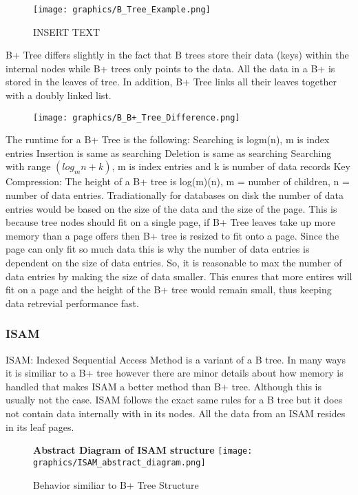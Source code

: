 \documentclass[letterpaper, 12pt]{article}
\begin{document}
\begin{figure}
  \centering
  \texttt{[image: graphics/B\_Tree\_Example.png]}
  \caption{INSERT TEXT}
  \label{fig:b_tree_ex}
\end{figure}

B+ Tree differs slightly in the fact that B trees store their data (keys) within the internal nodes while
B+ trees only points to the data. All the data in a B+ is stored in the leaves of tree. In addition,
B+ Tree links all their leaves together with a doubly linked list.

\begin{figure}
  \centering
  \texttt{[image: graphics/B\_B+\_Tree\_Difference.png]}
  \label{fig:b_b+_tree_diff}
\end{figure}

The runtime for a B+ Tree is the following:
Searching is logm(n), m is index entries
Insertion is same as searching
Deletion is same as searching
Searching with range $( log_m n + k) $, m is index entries and k is number of data records
Key Compression:
The height of a B+ tree is log(m)(n), m = number of children, n = number of data entries.
Tradiationally for databases on disk the number of data entries would be based on the size of the data and
the size of the page. This is because tree nodes should fit on a single page, if B+ Tree leaves take up more
memory than a page offers then B+ tree is resized to fit onto a page. Since the page can only fit so much
data this is why the number of data entries is dependent on the size of data entries. So, it is reasonable
to max the number of data entries by making the size of data smaller. This enures that more entires will
fit on a page and the height of the B+ tree would remain small, thus keeping data retrevial performance fast.

\subsubsection{ISAM}
ISAM:
Indexed Sequential Access Method is a variant of a B tree. In many ways it is similiar to a B+ tree however there are minor details about how memory is handled
that makes ISAM a better method than B+ tree. Although this is usually not the case. ISAM follows the exact same rules for a B tree but it does not contain
data internally with in its nodes. All the data from an ISAM resides in its leaf pages.

\begin{figure}
  \centering
  \textbf{Abstract Diagram of ISAM structure}
  \texttt{[image: graphics/ISAM\_abstract\_diagram.png]}
  \caption{Behavior similiar to B+ Tree Structure}
\end{figure}
\end{document}
